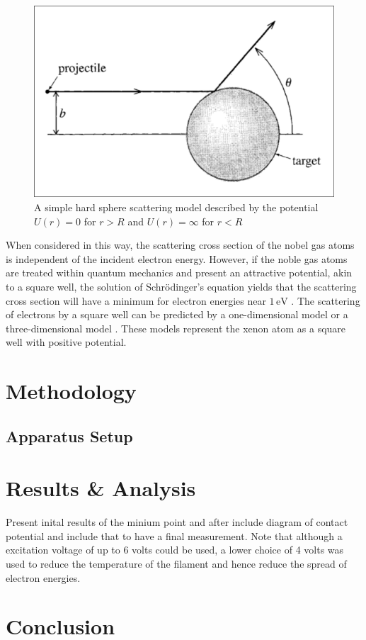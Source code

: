 \documentclass[%
reprint,
amsmath,amssymb,
aps,
floatfix
]{revtex4-2}
\begin{document}
	\begin{figure}
		\includegraphics[width=0.85\columnwidth]{hardSphereScattering.png}
		\caption{\label{fig:hardSphereScattering}A simple hard sphere scattering model described by the potential $U(r) = 0$ for $r > R$ and $U(r) = \infty$ for $r < R$}
	\end{figure}
	
	When considered in this way, the scattering cross section of the nobel gas atoms is independent of the incident electron energy. However, if the noble gas atoms are treated within quantum mechanics and present an attractive potential, akin to a square well, the solution of Schrödinger's equation yields that the scattering cross section will have a minimum for electron energies near $1 \,\text{eV}$ \cite{kukolich} \cite{sobhani}. The scattering of electrons by a square well can be predicted by a one-dimensional model or a three-dimensional model \cite{kukolich}. These models represent the xenon atom as a square well with positive potential.
	
	\section{Methodology}
	\subsection{Apparatus Setup}
	
	
	\section{Results \& Analysis}
	Present inital results of the minium point and after include diagram of contact potential and include that to have a final measurement. Note that although a excitation voltage of up to 6 volts could be used, a lower choice of 4 volts was used to reduce the temperature of the filament and hence reduce the spread of electron energies.
	
	\section{Conclusion}
		
	\clearpage
	
	\clearpage
	\onecolumngrid
	\appendix


	
	
\end{document}
